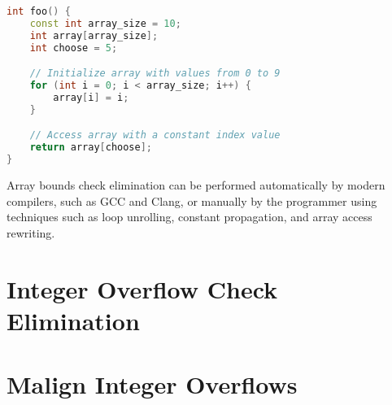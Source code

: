 \begin{lstlisting}[language=C++]
int foo() {
    const int array_size = 10;
    int array[array_size];
    int choose = 5;

    // Initialize array with values from 0 to 9
    for (int i = 0; i < array_size; i++) {
        array[i] = i;
    }

    // Access array with a constant index value
    return array[choose];
}
\end{lstlisting}

Array bounds check elimination can be performed automatically by modern compilers, such as GCC and Clang, or manually by the programmer using techniques such as loop unrolling, constant propagation, and array access rewriting.

\section{Integer Overflow Check Elimination}
\label{sec:integerOverflow}


\section{Malign	Integer	Overflows}
\label{sec:malignInteger}
